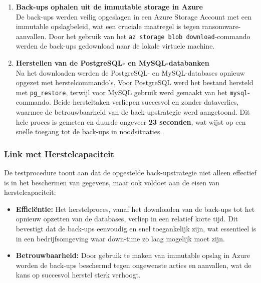 \begin{enumerate}
    \item \textbf{Back-ups ophalen uit de immutable storage in Azure} \\
    De back-ups werden veilig opgeslagen in een Azure Storage Account met een immutable opslagbeleid, wat een cruciale maatregel is tegen ransomware-aanvallen. Door het gebruik van het \texttt{az storage blob download}-commando werden de back-ups gedownload naar de lokale virtuele machine.
    
    \item \textbf{Herstellen van de PostgreSQL- en MySQL-databanken} \\
    Na het downloaden werden de PostgreSQL- en MySQL-databases opnieuw opgezet met herstelcommando’s. Voor PostgreSQL werd het bestand hersteld met \texttt{pg\_restore}, terwijl voor MySQL gebruik werd gemaakt van het \texttt{mysql}-commando. Beide hersteltaken verliepen succesvol en zonder dataverlies, waarmee de betrouwbaarheid van de back-upstrategie werd aangetoond. Dit hele proces is gemeten en duurde ongeveer \textbf{23 seconden}, wat wijst op een snelle toegang tot de back-ups in noodsituaties.
\end{enumerate}

\subsubsection{Link met Herstelcapaciteit}
De testprocedure toont aan dat de opgestelde back-upstrategie niet alleen effectief is in het beschermen van gegevens, maar ook voldoet aan de eisen van herstelcapaciteit:

\begin{itemize}
    \item \textbf{Efficiëntie:} Het herstelproces, vanaf het downloaden van de back-ups tot het opnieuw opzetten van de databases, verliep in een relatief korte tijd. Dit bevestigt dat de back-ups eenvoudig en snel toegankelijk zijn, wat essentieel is in een bedrijfsomgeving waar down-time zo laag mogelijk moet zijn.
    
    \item \textbf{Betrouwbaarheid:} Door gebruik te maken van immutable opslag in Azure worden de back-ups beschermd tegen ongewenste acties en aanvallen, wat de kans op succesvol herstel sterk verhoogt.
\end{itemize}

